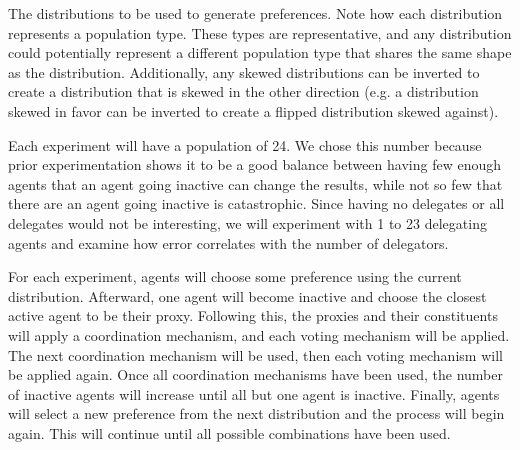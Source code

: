 \begin{table}[!htbp]
    \renewcommand{\arraystretch}{1.3}

    \caption{
        The distributions to be used to generate preferences.
        Note how each distribution represents a population type.
        These types are representative, and any distribution could potentially
        represent a different population type that shares the same shape as the
        distribution.
        Additionally, any skewed distributions can be inverted to create a
        distribution that is skewed in the other direction (e.g. a distribution
        skewed in favor can be inverted to create a flipped distribution skewed
        against).
    }
    \label{tab:\chptindicator-distributions-used}

    \centering
    
\end{table}

Each experiment will have a population of 24.
We chose this number because prior experimentation shows it to be a good balance
between having few enough agents that an agent going inactive can change the
results, while not so few that there are an agent going inactive is catastrophic.
Since having no delegates or all delegates would not be interesting, we will
experiment with 1 to 23 delegating agents and examine how error correlates with
the number of delegators.

For each experiment, agents will choose some preference using the current distribution.
Afterward, one agent will become inactive and choose the closest active agent to be
their proxy.
Following this, the proxies and their constituents will apply a coordination
mechanism, and each voting mechanism will be applied.
The next coordination mechanism will be used, then each voting mechanism will be
applied again.
Once all coordination mechanisms have been used, the number of inactive agents will
increase until all but one agent is inactive.
Finally, agents will select a new preference from the next distribution and the
process will begin again.
This will continue until all possible combinations have been used.
